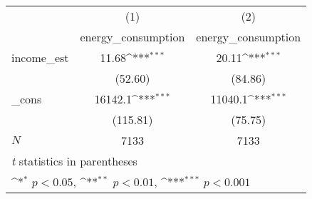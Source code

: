{
\def\sym#1{\ifmmode^{#1}\else\(^{#1}\)\fi}
\begin{tabular}{l*{2}{c}}
\hline\hline
            &\multicolumn{1}{c}{(1)}&\multicolumn{1}{c}{(2)}\\
            &\multicolumn{1}{c}{energy\_consumption}&\multicolumn{1}{c}{energy\_consumption}\\
\hline
income\_est  &       11.68\sym{***}&       20.11\sym{***}\\
            &     (52.60)         &     (84.86)         \\
[1em]
\_cons      &     16142.1\sym{***}&     11040.1\sym{***}\\
            &    (115.81)         &     (75.75)         \\
\hline
\(N\)       &        7133         &        7133         \\
\hline\hline
\multicolumn{3}{l}{\footnotesize \textit{t} statistics in parentheses}\\
\multicolumn{3}{l}{\footnotesize \sym{*} \(p<0.05\), \sym{**} \(p<0.01\), \sym{***} \(p<0.001\)}\\
\end{tabular}
}
